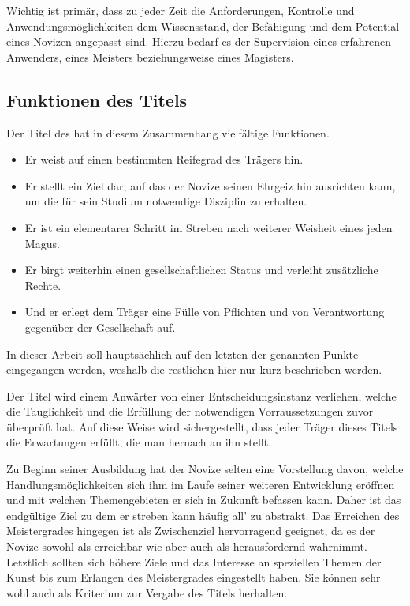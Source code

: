 \documentclass[a5paper,8pt]{book}
\begin{document}
Wichtig ist primär, dass zu jeder Zeit die Anforderungen, Kontrolle und
Anwendungsmöglichkeiten dem Wissensstand, der Befähigung und dem Potential
eines Novizen angepasst sind. Hierzu bedarf es der Supervision eines erfahrenen
Anwenders, eines Meisters beziehungsweise eines Magisters.
\newpage
\subsection*{Funktionen des Titels}
Der Titel des \meisters hat in diesem Zusammenhang vielfältige Funktionen.
\begin{itemize}
  \item Er weist auf einen bestimmten Reifegrad des Trägers hin.
  \item Er stellt ein Ziel dar, auf das der Novize seinen Ehrgeiz hin
  ausrichten kann, um die für sein Studium notwendige Disziplin zu erhalten.
  \item Er ist ein elementarer Schritt im Streben nach weiterer Weisheit
  eines jeden Magus.
  \item Er birgt weiterhin einen gesellschaftlichen Status und verleiht
  zusätzliche Rechte.
  \item Und er erlegt dem Träger eine Fülle von Pflichten und
  von Verantwortung gegenüber der Gesellschaft auf.
\end{itemize}

In dieser Arbeit soll hauptsächlich auf den letzten der genannten Punkte
eingegangen werden, weshalb die restlichen hier nur kurz beschrieben werden.

Der Titel \meister wird einem Anwärter von einer Entscheidungsinstanz
verliehen, welche die Tauglichkeit und die Erfüllung der notwendigen
Vorraussetzungen zuvor überprüft hat. Auf diese Weise wird sichergestellt, dass
jeder Träger dieses Titels die Erwartungen erfüllt, die man hernach an ihn
stellt.

Zu Beginn seiner Ausbildung hat der Novize selten eine Vorstellung davon,
welche Handlungsmöglichkeiten sich ihm im Laufe seiner weiteren Entwicklung
eröffnen und mit welchen Themengebieten er sich in Zukunft befassen kann. Daher
ist das endgültige Ziel zu dem er streben kann häufig all' zu abstrakt. Das
Erreichen des Meistergrades hingegen ist als Zwischenziel hervorragend
geeignet, da es der Novize sowohl als erreichbar wie aber auch als
herausfordernd wahrnimmt. Letztlich sollten sich höhere Ziele und das Interesse
an speziellen Themen der Kunst bis zum Erlangen des Meistergrades eingestellt
haben. Sie können sehr wohl auch als Kriterium zur Vergabe des Titels
herhalten.
\end{document}
